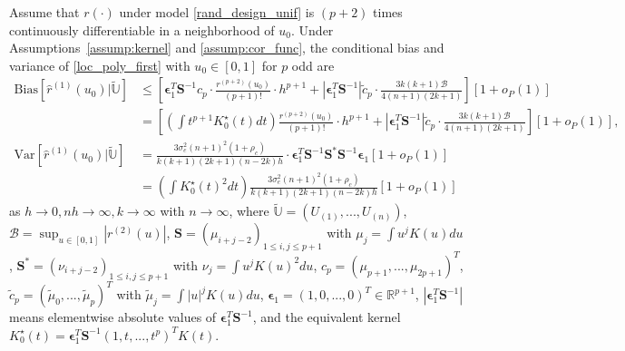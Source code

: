 \documentclass{uwstat572}
\theoremstyle{definition}
\renewcommand{\hat}{\widehat}
\renewcommand{\tilde}{\widetilde}
\theoremstyle{theorem}
\newenvironment{customthm}[1]
{\renewcommand\theinnercustomthm{#1}\innercustomthm}
{\endinnercustomthm}
\begin{document}
\begin{customthm}{3}[Theorem 2 in \citealt{liu2020smoothed}]
Assume that $r(\cdot)$ under model \eqref{rand_design_unif} is $(p+2)$ times continuously differentiable in a neighborhood of $u_0$. Under Assumptions~\ref{assump:kernel} and \ref{assump:cor_func}, the conditional bias and variance of \eqref{loc_poly_first} with $u_0\in [0,1]$ for $p$ odd are
\begin{align*}
	\mathrm{Bias}\left[\hat{r}^{(1)}(u_0) | \tilde{\mathbb{U}}\right] &\leq\left[\bm{\epsilon}_1^T \bm{S}^{-1}c_p\cdot \frac{r^{(p+2)}(u_0)}{(p+1)!} \cdot h^{p+1} + \left|\bm{\epsilon}_1^T \bm{S}^{-1} \right|\tilde{c}_p \cdot \frac{3k(k+1) \mathcal{B}}{4(n+1)(2k+1)}\right] \left[1+o_P(1)\right]\\
	&= \left[\left(\int t^{p+1} K_0^{\star}(t) dt\right) \frac{r^{(p+2)}(u_0)}{(p+1)!} \cdot h^{p+1} + \left|\bm{\epsilon}_1^T \bm{S}^{-1}\right| \tilde{c}_p \cdot\frac{3k(k+1) \mathcal{B}}{4(n+1)(2k+1)}\right] \left[1+o_P(1)\right],\\
	\mathrm{Var}\left[\hat{r}^{(1)}(u_0) | \tilde{\mathbb{U}}\right] &= \frac{3\sigma_e^2 (n+1)^2 (1+\rho_c)}{k(k+1)(2k+1) (n-2k) h} \cdot \bm{\epsilon}_1^T \bm{S}^{-1} \bm{S}^* \bm{S}^{-1} \bm{\epsilon}_1 \left[1+o_P(1)\right]\\
	&= \left(\int K_0^{\star}(t)^2 dt \right) \frac{3\sigma_e^2 (n+1)^2 (1+\rho_c)}{k(k+1)(2k+1) (n-2k) h} \left[1+o_P(1)\right]
\end{align*}
as $h\to 0, nh\to \infty, k\to \infty$ with $n\to \infty$, where $\tilde{\mathbb{U}}=\left(U_{(1)},...,U_{(n)}\right)$, $\mathcal{B}=\sup_{u\in [0,1]}\left|r^{(2)}(u) \right|$, $\bm{S}=\left(\mu_{i+j-2}\right)_{1\leq i,j\leq p+1}$ with $\mu_j=\int u^j K(u) du$, $\bm{S}^*=\left(\nu_{i+j-2}\right)_{1\leq i,j\leq p+1}$ with $\nu_j = \int u^j K(u)^2 du$, $c_p=\left(\mu_{p+1},...,\mu_{2p+1} \right)^T$, $\tilde{c}_p=\left(\tilde{\mu}_0,...,\tilde{\mu}_{p} \right)^T$ with $\tilde{\mu}_j=\int |u|^j K(u) du$, $\bm{\epsilon}_1=(1,0,...,0)^T \in \mathbb{R}^{p+1}$, $\left|\bm{\epsilon}_1^T\bm{S}^{-1}\right|$ means elementwise absolute values of $\bm{\epsilon}_1^T\bm{S}^{-1}$, and the equivalent kernel $K_0^{\star}(t) = \bm{\epsilon}_1^T \bm{S}^{-1} \left(1,t,...,t^p\right)^T K(t)$.
\end{customthm}
\end{document}
